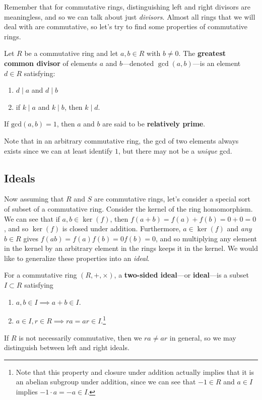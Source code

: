   Remember that for commutative rings, distinguishing left and right divisors are meaningless, and so we can talk about just \textit{divisors}. Almost all rings that we will deal with are commutative, so let's try to find some properties of commutative rings.  

  \begin{definition}
    \label{def:greatest-common-divisor}
    Let $R$ be a commutative ring and let $a, b \in R$ with $b \neq 0$. The \textbf{greatest common divisor} of elements $a$ and $b$---denoted $\gcd(a, b)$---is an element $d \in R$ satisfying: 
    \begin{enumerate}
      \item $d \mid a$ and $d \mid b$ 
      \item if $k \mid a$ and $k \mid b$, then $k \mid d$. 
    \end{enumerate}
    If $\mathrm{gcd}(a, b) = 1$, then $a$ and $b$ are said to be \textbf{relatively prime}. 
  \end{definition} 

  Note that in an arbitrary commutative ring, the gcd of two elements always exists since we can at least identify $1$, but there may not be a \textit{unique} gcd. 

\subsection{Ideals}

  Now assuming that $R$ and $S$ are commutative rings, let's consider a special sort of subset of a commutative ring. Consider the kernel of the ring homomorphism. We can see that if $a, b \in \ker(f)$, then $f(a + b) = f(a) + f(b) = 0 + 0 = 0$, and so $\ker(f)$ is closed under addition. Furthermore, $a \in \ker(f)$ and \textit{any} $b \in R$ gives $f(ab) = f(a) f(b) = 0 f(b) = 0$, and so multiplying any element in the kernel by an arbitrary element in the rings keeps it in the kernel. We would like to generalize these properties into an \textit{ideal}. 

  \begin{definition}[Ideals]
    \label{def:ideals}
    For a commutative ring $(R,+, \times)$, a \textbf{two-sided ideal}---or \textbf{ideal}---is a subset $I \subset R$ satisfying 
    \begin{enumerate}
      \item $a, b \in I \implies a + b \in I$. 
      \item $a \in I, r \in R \implies ra = ar \in I$.\footnote{Note that this property and closure under addition actually implies that it is an abelian subgroup under addition, since we can see that $-1 \in R$ and $a \in I$ implies $-1 \cdot a = -a \in I$.}
    \end{enumerate}
    If $R$ is not necessarily commutative, then we $ra \neq ar$ in general, so we may distinguish between left and right ideals. 
  \end{definition}

